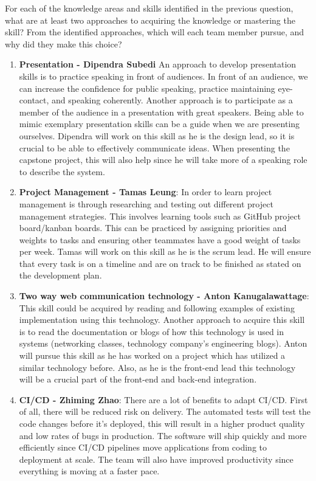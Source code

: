 \documentclass[12pt, titlepage]{article}
\begin{document}
For each of the knowledge areas and skills identified in the previous question, what are at least two approaches to acquiring the knowledge or mastering the skill? From the identified approaches, which will each team member pursue, and why did they make this choice?

\begin{enumerate}

\item \textbf{Presentation - Dipendra Subedi} An approach to develop presentation skills is to practice speaking in front of audiences. In front of an audience, we can increase the confidence for public speaking, practice maintaining eye-contact, and speaking coherently. Another approach is to participate as a member of the audience in a presentation with great speakers. Being able to mimic exemplary presentation skills can be a guide when we are presenting ourselves. Dipendra will work on this skill as he is the design lead, so it is crucial to be able to effectively communicate ideas. When presenting the capstone project, this will also help since he will take more of a speaking role to describe the system.

\item  \textbf{Project Management - Tamas Leung}: In order to learn project management is through researching and testing out different project management strategies. This involves learning tools such as GitHub project board/kanban boards. This can be practiced by assigning priorities and weights to tasks and ensuring other teammates have a good weight of tasks per week. Tamas will work on this skill as he is the scrum lead. He will ensure that every task is on a timeline and are on track to be finished as stated on the development plan.

\item \textbf{Two way web communication technology - Anton Kanugalawattage}: This skill could be acquired by reading and following examples of existing implementation using this technology. Another approach to acquire this skill is to read the documentation or blogs of how this technology is used in systems (networking classes, technology company's engineering blogs). Anton will pursue this skill as he has worked on a project which has utilized a similar technology before. Also, as he is the front-end lead this technology will be a crucial part of the front-end and back-end integration. 

\item \textbf{CI/CD - Zhiming Zhao}: There are a lot of benefits to adapt CI/CD. First of all, there will be reduced risk on delivery. The automated tests will test the code changes before it's deployed, this will result in a higher product quality and low rates of bugs in production. The software will ship quickly and more efficiently since CI/CD pipelines move applications from coding to deployment at scale. The team will also have improved productivity since everything is moving at a faster pace.


\end{enumerate}
\end{document}
